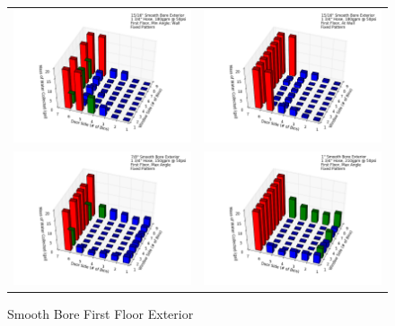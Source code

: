 \documentclass{article}
\begin{document}
\begin{appendices}
\begin{figure}[ht]
{\begin{tabular*}{\textwidth}{lr}
\includegraphics[width=3.2in]{../ADD_Analysis/Figures/15-12-08_104150_Datafile_15_16in_Smooth_Bore_Exterior.png} &
\includegraphics[width=3.2in]{../ADD_Analysis/Figures/15-12-08_104620_Datafile_15_16in_Smooth_Bore_Exterior.png} \\
\includegraphics[width=3.2in]{../ADD_Analysis/Figures/15-12-08_105851_Datafile_7_8in_Smooth_Bore_Exterior.png} &
\includegraphics[width=3.2in]{../ADD_Analysis/Figures/15-12-08_110730_Datafile_1in_Smooth_Bore_Exterior.png} \\
\end{tabular*}}
\caption{Smooth Bore First Floor Exterior}
\label{fig:Smooth Bore First Floor Exterior}
\end{figure}


\end{appendices}
\end{document}
